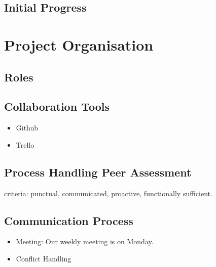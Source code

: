 \documentclass[11pt]{article}
\begin{document}
\subsection{Initial Progress}


\section{Project Organisation}
\subsection{Roles}
\subsection{Collaboration Tools}
\begin{itemize}
	\item Github
	\item Trello
\end{itemize}
\subsection{Process Handling Peer Assessment}
criteria: punctual, communicated, proactive, functionally sufficient. 
\subsection{Communication Process}
\begin{itemize}
	\item Meeting: Our weekly meeting is on Monday.
	\item Conflict Handling
\end{itemize}
\end{document}
